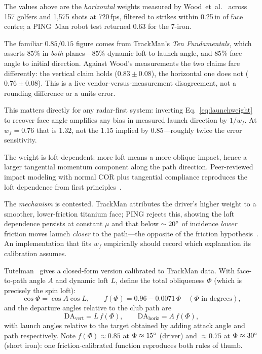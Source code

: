 \begin{warning}
The values above are the \emph{horizontal} weights measured by
Wood~et~al.~\cite{facepathstudy} across 157 golfers and 1{,}575 shots at
720\,fps, filtered to strikes within 0.25\,in of face centre; a PING~Man
robot test returned $0.63$ for the 7-iron.

The familiar $0.85/0.15$ figure comes from TrackMan's \emph{Ten
Fundamentals}, which asserts $85\%$ in \emph{both} planes---$85\%$ dynamic
loft to launch angle, and $85\%$ face angle to initial direction. Against
Wood's measurements the two claims fare differently: the vertical claim
holds ($0.83 \pm 0.08$), the horizontal one does not ($0.76 \pm 0.08$).
This is a live vendor-versus-measurement disagreement, not a rounding
difference or a units error.

This matters directly for any radar-first system: inverting
Eq.~\eqref{eq:launchweight} to recover face angle amplifies any bias in
measured launch direction by $1/w_f$. At $w_f = 0.76$ that is $1.32$, not
the $1.15$ implied by $0.85$---roughly twice the error sensitivity.
\end{warning}

The weight is loft-dependent: more loft means a more oblique
impact, hence a larger tangential momentum component along the path
direction. Peer-reviewed impact modeling with normal COR plus tangential
compliance reproduces the loft dependence from first
principles~\cite{mdpifriction,facepathstudy}.

The \emph{mechanism} is contested. TrackMan attributes the driver's higher
weight to a smoother, lower-friction titanium face; PING rejects this,
showing the loft dependence persists at constant $\mu$ and that below
$\sim20\si{\degree}$ of incidence \emph{lower} friction moves launch \emph{closer}
to the path---the opposite of the friction hypothesis~\cite{mdpifriction}.
An implementation that fits $w_f$ empirically should record which
explanation its calibration assumes.

Tutelman~\cite{tutelman3d} gives a closed-form version calibrated to
TrackMan data. With face-to-path angle $A$ and dynamic loft $L$, define the
total obliqueness $\Phi$ (which is precisely the spin loft):
\begin{equation}
\label{eq:obliqueness}
\cos\Phi = \cos A \cos L, \qquad
f(\Phi) = 0.96 - 0.0071\,\Phi \quad (\Phi \text{ in degrees}),
\end{equation}
and the departure angles relative to the club path are
\begin{equation}
\label{eq:tutelmanlaunch}
\mathrm{DA}_{\mathrm{vert}} = L\,f(\Phi), \qquad
\mathrm{DA}_{\mathrm{horiz}} = A\,f(\Phi),
\end{equation}
with launch angles relative to the target obtained by adding attack angle
and path respectively. Note $f(\Phi)\approx0.85$ at $\Phi\approx15\si{\degree}$
(driver) and $\approx0.75$ at $\Phi\approx30\si{\degree}$ (short iron): one
friction-calibrated function reproduces both rules of thumb.

